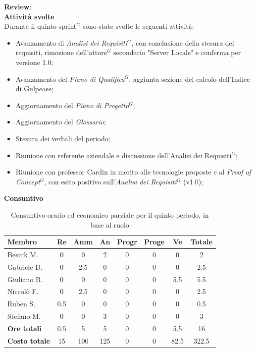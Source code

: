\documentclass[a4paper,10pt]{article}
\begin{document}
\textbf{Review}: \\
\textbf{Attività svolte}\\
Durante il quinto sprint$^G$ sono state svolte le seguenti attività:
\begin{itemize}
  \item Avanzamento di \textit{Analisi dei Requisiti$^G$}, con conclusione della stesura dei requisiti, rimozione dell'attore$^G$ secondario "Server Locale" e conferma per versione 1.0;
  \item Avanzamento del \textit{Piano di Qualifica$^G$}, aggiunta sezione del calcolo dell'Indice di Gulpease;
  \item Aggiornamento del \textit{Piano di Progetto$^G$};
  \item Aggiornamento del \textit{Glossario};
  \item Stesura dei verbali del periodo;
  \item Riunione con referente aziendale e discussione dell'Analisi dei Requisiti$^G$;
  \item Riunione con professor Cardin in merito alle tecnologie proposte e al \textit{Proof of Concept$^G$}, con esito positivo sull'\textit{Analisi dei Requisiti$^G$} (v1.0);
\end{itemize}
\textbf{Consuntivo}
\begin{table}[H]
\centering
\begin{tabular}{|l|c|c|c|c|c|c|c|}
\hline
\textbf{Membro} & \textbf{Re} & \textbf{Amm} & \textbf{An} & \textbf{Progr} & \textbf{Proge} & \textbf{Ve} & \textbf{Totale} \\
\hline
Besnik M.   & 0   & 0   & 2   & 0   & 0   & 0   & 2   \\
Gabriele D. & 0   & 2.5 & 0   & 0   & 0   & 0   & 2.5 \\
Giuliano B. & 0   & 0   & 0   & 0   & 0   & 5.5 & 5.5 \\
Niccolò F.  & 0   & 2.5 & 0   & 0   & 0   & 0   & 2.5   \\
Ruben S.    & 0.5 & 0   & 0   & 0   & 0   & 0   & 0.5  \\
Stefano M.  & 0   & 0   & 3   & 0   & 0   & 0   & 3   \\
\hline
\textbf{Ore totali}   & 0.5 & 5   & 5   & 0  & 0  & 5.5 & 16 \\
\hline
\textbf{Costo totale} & 15  & 100 & 125 & 0  & 0  & 82.5 & 322.5 \\
\hline
\end{tabular}
\caption{Consuntivo orario ed economico parziale per il quinto periodo, in base al ruolo}
\end{table}
\end{document}

